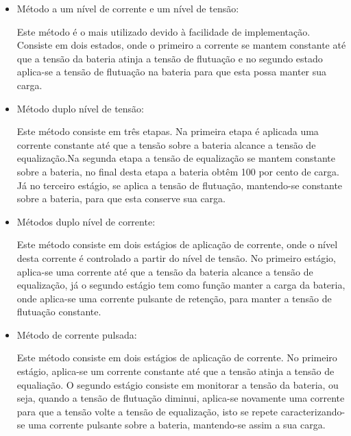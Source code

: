 \begin{itemize}
\item Método a um nível de corrente e um nível de tensão: 
\par Este método é o mais utilizado devido à facilidade de implementação. Consiste em dois estados, onde o primeiro a corrente se mantem constante até que a tensão da bateria atinja a tensão de flutuação e no segundo estado aplica-se a tensão de flutuação na bateria para que esta possa manter sua carga.
\item Método duplo nível de tensão:
\par Este método consiste em três etapas. Na primeira etapa é aplicada uma corrente constante até que a tensão sobre a bateria alcance a tensão de equalização.Na segunda etapa a tensão de equalização se mantem constante sobre a bateria, no final desta etapa a bateria obtêm 100 por cento de carga. Já no terceiro estágio, se aplica a tensão de flutuação, mantendo-se constante sobre a bateria, para que esta conserve sua carga.
\item Métodos duplo nível de corrente:
\par Este método consiste em dois estágios de aplicação de corrente,  onde o nível desta corrente é controlado a partir do nível de tensão. No primeiro estágio, aplica-se uma corrente até que a tensão da bateria alcance a tensão de equalização, já o segundo estágio tem como função manter a carga da bateria, onde aplica-se uma corrente pulsante de retenção, para manter a tensão de flutuação constante.
\item Método de corrente pulsada: 
\par Este método consiste em dois estágios de aplicação de corrente. No primeiro estágio, aplica-se um corrente constante até que a tensão atinja a tensão de equaliação. O segundo estágio consiste em monitorar a tensão da bateria, ou seja, quando a tensão de flutuação diminui, aplica-se novamente uma corrente para que a tensão volte a tensão de equalização, isto se repete caracterizando-se uma corrente pulsante sobre a bateria, mantendo-se assim a sua carga. 

\end{itemize}

